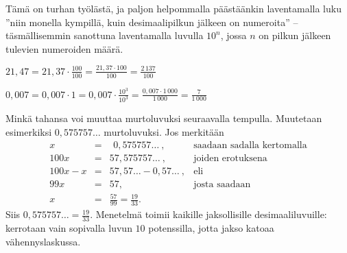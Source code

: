 Tämä on turhan työlästä, ja paljon helpommalla päästäänkin laventamalla luku ''niin monella kympillä, kuin desimaalipilkun jälkeen on numeroita'' – täsmällisemmin sanottuna laventamalla luvulla $10^n$, jossa $n$ on pilkun jälkeen tulevien numeroiden määrä.

\begin{esimerkki}
$21,47 = 21,37 \cdot  \frac{100}{100} = \frac{21,37 \cdot 100}{100} = \frac{2\,137}{100}$
\end{esimerkki}

\begin{esimerkki}
$0,007 = 0,007 \cdot 1 = 0,007 \cdot \frac{10^3}{10^3} = \frac{0,007 \cdot 1\,000}{1\,000} = \frac{7}{1\,000}$
\end{esimerkki}


Minkä tahansa  voi muuttaa murtoluvuksi seuraavalla tempulla. Muutetaan esimerkiksi $0,575757\ldots$ murtoluvuksi. Jos merkitään
\[
\begin{array}{rcll}
x &=& \ \, 0,575757 \ldots\ , &\textrm{saadaan sadalla kertomalla} \\
100x &=& 57,575757 \ldots \ , &\textrm{joiden erotuksena} \\
100x - x &=& 57,57 \ldots - 0,57 \ldots \ , & \textrm{eli} \\
99x &=& 57, & \textrm{josta saadaan} \\
x &=& \frac{57}{99} = \frac{19}{33}.
\end{array}
\]
Siis $0,575757\ldots = \frac{19}{33}$. Menetelmä toimii kaikille jaksollisille desimaaliluvuille: kerrotaan vain sopivalla luvun $10$ potenssilla, jotta jakso katoaa vähennyslaskussa.

